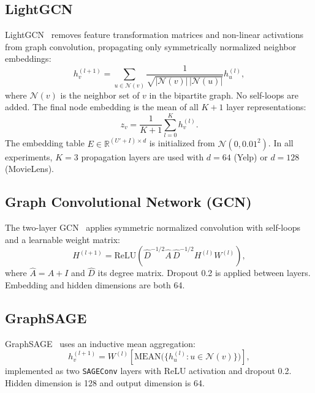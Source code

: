 \subsection{LightGCN}

LightGCN~\cite{he2020lightgcn} removes feature transformation matrices and non-linear activations from graph convolution, propagating only symmetrically normalized neighbor embeddings:
\begin{equation}
    h_v^{(l+1)} = \sum_{u \in \mathcal{N}(v)} \frac{1}{\sqrt{|\mathcal{N}(v)|\,|\mathcal{N}(u)|}} h_u^{(l)},
    \label{eq:lightgcn}
\end{equation}
where $\mathcal{N}(v)$ is the neighbor set of $v$ in the bipartite graph. No self-loops are added. The final node embedding is the mean of all $K+1$ layer representations:
\begin{equation}
    z_v = \frac{1}{K+1}\sum_{l=0}^{K} h_v^{(l)}.
    \label{eq:lightgcn_pool}
\end{equation}
The embedding table $E \in \mathbb{R}^{(U' + I) \times d}$ is initialized from $\mathcal{N}(0, 0.01^2)$. In all experiments, $K = 3$ propagation layers are used with $d = 64$ (Yelp) or $d = 128$ (MovieLens).

\subsection{Graph Convolutional Network (GCN)}

The two-layer GCN~\cite{kipf2017semi} applies symmetric normalized convolution with self-loops and a learnable weight matrix:
\begin{equation}
    H^{(l+1)} = \text{ReLU}\!\left(\hat{D}^{-1/2} \hat{A}\, \hat{D}^{-1/2} H^{(l)} W^{(l)}\right),
    \label{eq:gcn}
\end{equation}
where $\hat{A} = A + I$ and $\hat{D}$ its degree matrix. Dropout 0.2 is applied between layers. Embedding and hidden dimensions are both 64.

\subsection{GraphSAGE}

GraphSAGE~\cite{hamilton2017inductive} uses an inductive mean aggregation:
\begin{equation}
    h_v^{(l+1)} = W^{(l)}\!\left[\text{MEAN}\bigl(\{h_u^{(l)} : u \in \mathcal{N}(v)\}\bigr)\right],
    \label{eq:sage}
\end{equation}
implemented as two \texttt{SAGEConv} layers with ReLU activation and dropout 0.2. Hidden dimension is 128 and output dimension is 64.


